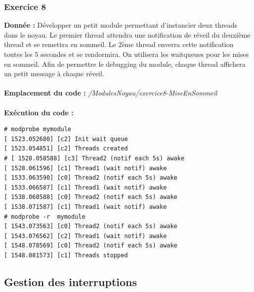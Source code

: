 \subsubsection{Exercice 8}
\textbf{Donnée : }Développer	un	petit	module	permettant	d’instancier	deux threads dans	le	noyau.	Le	premier	thread	attendra	une	notification	de	réveil	du	deuxième	thread et	se	remettra	en sommeil.	Le	2ème thread	enverra	cette	notification	toutes	les	5	secondes	et	se	rendormira. On	utilisera	les	waitqueues pour	les	mises	en	sommeil.	Afin	de	permettre	le	debugging	du	module,	chaque	thread	affichera	un	petit	message	à	chaque	réveil.\\\\
\textbf{Emplacement du code : } \textit{/ModulesNoyau/exercice8-MiseEnSommeil}\\\\
\textbf{Exécution du code : }
\begin{lstlisting}
# modprobe mymodule                                                             
[ 1523.052680] [c2] Init wait queue                                             
[ 1523.054851] [c2] Threads created                                             
# [ 1528.058588] [c3] Thread2 (notif each 5s) awake                             
[ 1528.061596] [c1] Thread1 (wait notif) awake                                  
[ 1533.063590] [c0] Thread2 (notif each 5s) awake                               
[ 1533.066587] [c1] Thread1 (wait notif) awake                                  
[ 1538.068588] [c0] Thread2 (notif each 5s) awake                               
[ 1538.071587] [c1] Thread1 (wait notif) awake                                  
# modprobe -r  mymodule                                                         
[ 1543.073563] [c0] Thread2 (notif each 5s) awake                               
[ 1543.076562] [c2] Thread1 (wait notif) awake                                  
[ 1548.078569] [c0] Thread2 (notif each 5s) awake                               
[ 1548.081573] [c1] Threads stopped  
\end{lstlisting}
\subsection{Gestion des interruptions}

